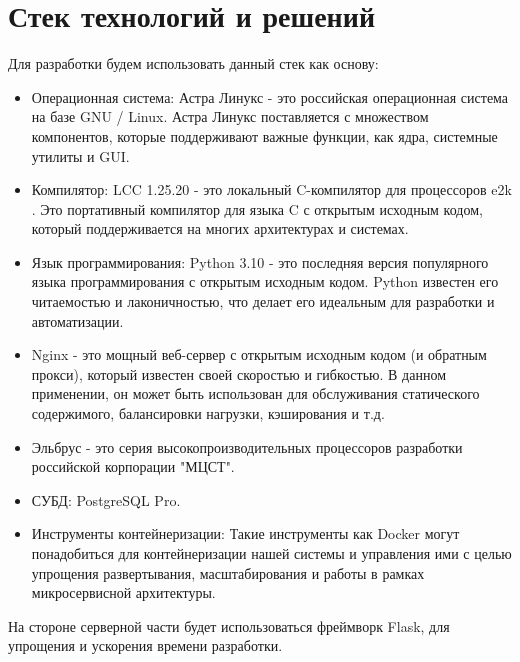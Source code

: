 \chapter{Стек технологий и решений}
\label{cha:impl}

Для разработки будем использовать данный стек как основу:

\begin{itemize}
    \item Операционная система: Астра Линукс - это российская операционная система на базе GNU / Linux. Астра Линукс поставляется с множеством компонентов, которые поддерживают важные функции, как ядра, системные утилиты и GUI. \cite{dev:astra_linux}
    \item Компилятор: LCC 1.25.20 - это локальный C-компилятор для процессоров e2k \cite{dev:elbrus_lcc}. Это портативный компилятор для языка C с открытым исходным кодом, который поддерживается на многих архитектурах и системах.
    \item Язык программирования: Python 3.10 - это последняя версия популярного языка программирования с открытым исходным кодом. Python известен его читаемостью и лаконичностью, что делает его идеальным для разработки и автоматизации.
    \item Nginx - это мощный веб-сервер с открытым исходным кодом (и обратным прокси), который известен своей скоростью и гибкостью. В данном применении, он может быть использован для обслуживания статического содержимого, балансировки нагрузки, кэширования и т.д.
    \item Эльбрус - это серия высокопроизводительных процессоров разработки российской корпорации "МЦСТ". \cite{dev:elbrus_cpu}
    \item СУБД: PostgreSQL Pro.
    \item Инструменты контейнеризации: Такие инструменты как Docker могут понадобиться для контейнеризации нашей системы и управления ими с целью упрощения развертывания, масштабирования и работы в рамках микросервисной архитектуры.


\end{itemize}

На стороне серверной части будет использоваться фреймворк Flask, для упрощения и ускорения времени разработки.



